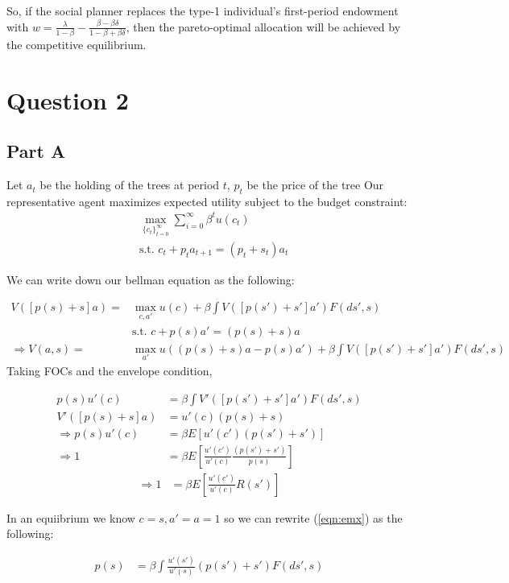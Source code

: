 \documentclass[11pt]{article} %
\begin{document}
So, if the social planner replaces the type-1 individual's first-period endowment with $w = \frac{\lambda}{1-\beta} -  \frac{\beta - \beta\delta}{1-\beta + \beta\delta}$, then the pareto-optimal allocation will be achieved by the competitive equilibrium.

\section{Question 2}
\subsection{Part A}

Let $a_t$ be the holding of the trees at period $t$, $p_t$ be the price of the tree
Our representative agent maximizes expected utility subject to the budget constraint:
\begin{align*}
&\max_{\{c_t\}_{t=0}^{\infty}} \sum_{i=0}^{\infty} \beta^t u(c_t)\\
&\text{s.t. }c_t + p_ta_{t+1} = (p_t+s_t)a_t 
\end{align*}

We can write down our bellman equation as the following:

\begin{align*}
V([p(s)+s]a) = &\max_{c,a'} u(c) + \beta  \int V([p(s')+s']a')F(ds',s)\\
&\text{s.t. } c + p(s)a' = (p(s) + s)a\\
\Rightarrow V(a,s) = &\max_{a'} u((p(s) +s)a -p(s)a') + \beta  \int V([p(s')+s']a')F(ds',s)
\end{align*}
Taking FOCs and the envelope condition,

\begin{align*}
p(s) u'(c) &= \beta \int V'([p(s')+s']a')F(ds',s)\\
V'([p(s)+s]a) &= u'(c)(p(s) + s ) \\
\Rightarrow p(s) u'(c)  &= \beta E[ u'(c')(p(s') + s' )]\\
\Rightarrow 1 &= \beta E\left[ \frac{u'(c')}{u'(c)} \frac{(p(s') + s' )}{p(s)}\right]
\end{align*}
\begin{align}
\Rightarrow 1 &= \beta E\left[ \frac{u'(c')}{u'(c)} R(s')\right] \label{eqn:emx}
\end{align}

In an equiibrium we know $c=s,a'=a=1$ so we can rewrite (\ref{eqn:emx}) as the following:

\begin{align}
 p(s)  &= \beta\int  \frac{u'(s')}{u'(s)}(p(s') + s' )F(ds',s) \label{eqn:emxfp}
\end{align}
\end{document}
